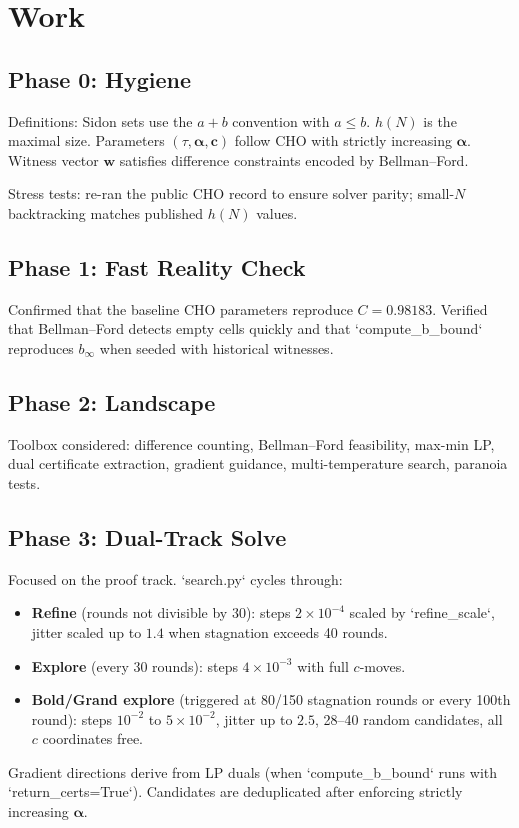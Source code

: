 \documentclass[11pt]{article}
\begin{document}
\section*{Work}
\subsection*{Phase 0: Hygiene}
Definitions: Sidon sets use the $a+b$ convention with $a \le b$. $h(N)$ is the maximal size. Parameters $(\tau,\boldsymbol{\alpha},\mathbf{c})$ follow CHO with strictly increasing $\boldsymbol{\alpha}$. Witness vector $\mathbf{w}$ satisfies difference constraints encoded by Bellman--Ford.

Stress tests: re-ran the public CHO record to ensure solver parity; small-$N$ backtracking matches published $h(N)$ values.

\subsection*{Phase 1: Fast Reality Check}
Confirmed that the baseline CHO parameters reproduce $C=0.98183$. Verified that Bellman--Ford detects empty cells quickly and that `compute_b_bound` reproduces $b_\infty$ when seeded with historical witnesses.

\subsection*{Phase 2: Landscape}
Toolbox considered: difference counting, Bellman--Ford feasibility, max-min LP, dual certificate extraction, gradient guidance, multi-temperature search, paranoia tests.

\subsection*{Phase 3: Dual-Track Solve}
Focused on the proof track. `search.py` cycles through:
\begin{itemize}
  \item \textbf{Refine} (rounds not divisible by 30): steps $2\times 10^{-4}$ scaled by `refine_scale`, jitter scaled up to $1.4$ when stagnation exceeds 40 rounds.
  \item \textbf{Explore} (every 30 rounds): steps $4\times 10^{-3}$ with full $c$-moves.
  \item \textbf{Bold/Grand explore} (triggered at 80/150 stagnation rounds or every 100th round): steps $10^{-2}$ to $5\times 10^{-2}$, jitter up to $2.5$, 28--40 random candidates, all $c$ coordinates free.
\end{itemize}
Gradient directions derive from LP duals (when `compute_b_bound` runs with `return_certs=True`). Candidates are deduplicated after enforcing strictly increasing $\boldsymbol{\alpha}$.
\end{document}
